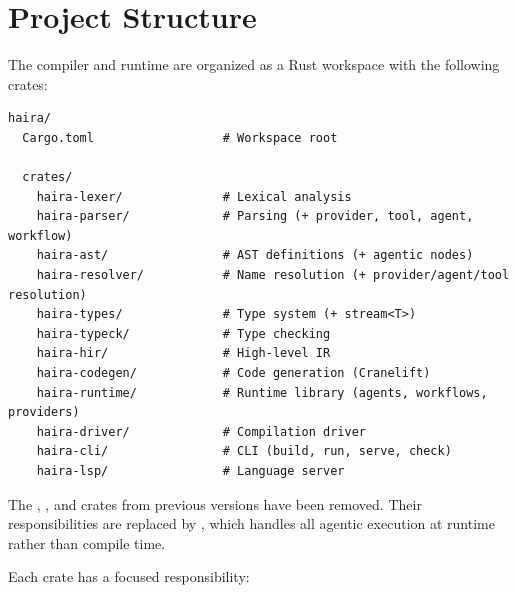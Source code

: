 \section{Project Structure}

The compiler and runtime are organized as a Rust workspace with the following crates:

\begin{lstlisting}[language={},numbers=none]
haira/
  Cargo.toml                  # Workspace root

  crates/
    haira-lexer/              # Lexical analysis
    haira-parser/             # Parsing (+ provider, tool, agent, workflow)
    haira-ast/                # AST definitions (+ agentic nodes)
    haira-resolver/           # Name resolution (+ provider/agent/tool resolution)
    haira-types/              # Type system (+ stream<T>)
    haira-typeck/             # Type checking
    haira-hir/                # High-level IR
    haira-codegen/            # Code generation (Cranelift)
    haira-runtime/            # Runtime library (agents, workflows, providers)
    haira-driver/             # Compilation driver
    haira-cli/                # CLI (build, run, serve, check)
    haira-lsp/                # Language server
\end{lstlisting}

\begin{note}
The , , and  crates from previous versions have been removed. Their responsibilities are replaced by , which handles all agentic execution at runtime rather than compile time.
\end{note}

Each crate has a focused responsibility:

